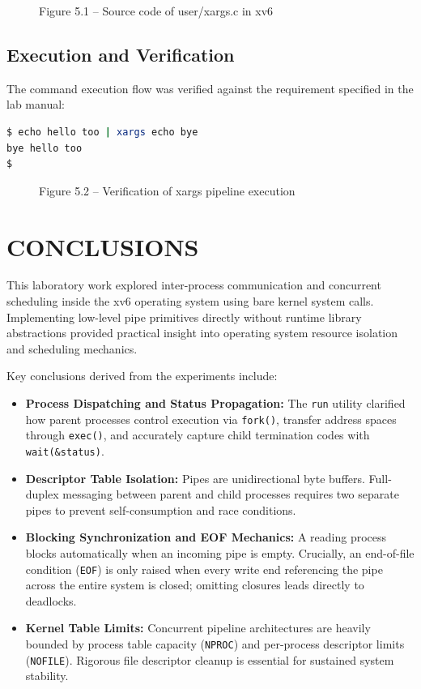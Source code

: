 \documentclass[12pt,a4paper]{report}
\numberwithin{equation}{chapter}
\numberwithin{figure}{chapter}
\numberwithin{table}{chapter}
\begin{document}
\begin{figure}[H]
\centering
\caption{Figure 5.1 -- Source code of user/xargs.c in xv6}
\end{figure}

\section{Execution and Verification}
The command execution flow was verified against the requirement specified in the lab manual:

\begin{lstlisting}[language=bash]
$ echo hello too | xargs echo bye
bye hello too
$ 
\end{lstlisting}

\begin{figure}[H]
\centering
\caption{Figure 5.2 -- Verification of xargs pipeline execution}
\end{figure}

\chapter{CONCLUSIONS}
This laboratory work explored inter-process communication and concurrent scheduling inside the xv6 operating system using bare kernel system calls. Implementing low-level pipe primitives directly without runtime library abstractions provided practical insight into operating system resource isolation and scheduling mechanics.

Key conclusions derived from the experiments include:
\begin{itemize}
    \item \textbf{Process Dispatching and Status Propagation:} The \texttt{run} utility clarified how parent processes control execution via \texttt{fork()}, transfer address spaces through \texttt{exec()}, and accurately capture child termination codes with \texttt{wait(\&status)}.
    \item \textbf{Descriptor Table Isolation:} Pipes are unidirectional byte buffers. Full-duplex messaging between parent and child processes requires two separate pipes to prevent self-consumption and race conditions.
    \item \textbf{Blocking Synchronization and EOF Mechanics:} A reading process blocks automatically when an incoming pipe is empty. Crucially, an end-of-file condition (\texttt{EOF}) is only raised when every write end referencing the pipe across the entire system is closed; omitting closures leads directly to deadlocks.
    \item \textbf{Kernel Table Limits:} Concurrent pipeline architectures are heavily bounded by process table capacity (\texttt{NPROC}) and per-process descriptor limits (\texttt{NOFILE}). Rigorous file descriptor cleanup is essential for sustained system stability.
\end{itemize}
\end{document}
